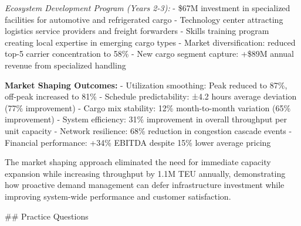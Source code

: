 \documentclass{article}
\begin{document}
\textit{Ecosystem Development Program (Years 2-3):}
- \$67M investment in specialized facilities for automotive and refrigerated cargo
- Technology center attracting logistics service providers and freight forwarders
- Skills training program creating local expertise in emerging cargo types
- Market diversification: reduced top-5 carrier concentration to 58\%
- New cargo segment capture: +\$89M annual revenue from specialized handling

\textbf{Market Shaping Outcomes:}
- Utilization smoothing: Peak reduced to 87\%, off-peak increased to 81\%
- Schedule predictability: ±4.2 hours average deviation (77\% improvement)
- Cargo mix stability: 12\% month-to-month variation (65\% improvement)
- System efficiency: 31\% improvement in overall throughput per unit capacity
- Network resilience: 68\% reduction in congestion cascade events
- Financial performance: +34\% EBITDA despite 15\% lower average pricing

The market shaping approach eliminated the need for immediate capacity expansion while increasing throughput by 1.1M TEU annually, demonstrating how proactive demand management can defer infrastructure investment while improving system-wide performance and customer satisfaction.

## Practice Questions
\end{document}
